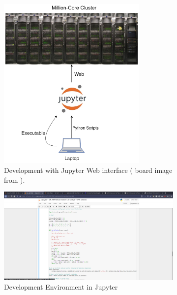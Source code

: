 \begin{figure}[!htbp]
\centering
\begin{subfigure}[!htbp]{1\textwidth}
    \centering
   \includegraphics[width=0.8\textwidth]{figures/jupyter.png}
       \caption{Development with Jupyter Web interface ( board image from \cite{spinn-core}).}
       \label{fig:jupyter}
\end{subfigure}

\begin{subfigure}[!htbp]{1\textwidth}
    \centering
   \includegraphics[width=1\textwidth]{figures/jupyter_dev.png}
       \caption{Development Environment in Jupyter}
       \label{fig:jupyter_dev}
\end{subfigure}

\caption[]{}
\end{figure}


